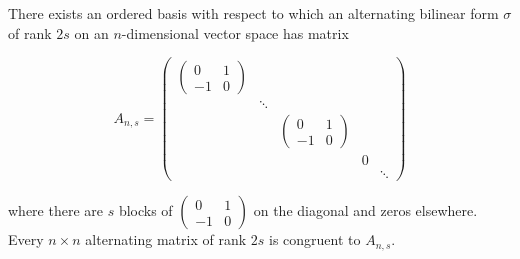 There exists an ordered basis with respect to which an alternating bilinear form $\sigma$ of rank $2s$ on an $n$-dimensional vector space has matrix

$$A_{n,s} = \begin{pmatrix}
\begin{pmatrix} 0 & 1 \\ -1 & 0 \end{pmatrix} & & & & \\
& \ddots & & & \\
& & \begin{pmatrix} 0 & 1 \\ -1 & 0 \end{pmatrix} & & \\
& & & 0 & \\
& & & & \ddots
\end{pmatrix}$$

where there are $s$ blocks of $\begin{pmatrix} 0 & 1 \\ -1 & 0 \end{pmatrix}$ on the diagonal and zeros elsewhere. Every $n \times n$ alternating matrix of rank $2s$ is congruent to $A_{n,s}$.
